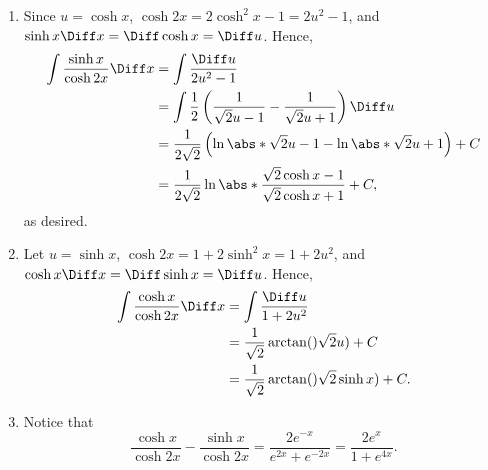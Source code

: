 \Question{\currfilebase}
\begin{enumerate}
    \item Since \(u = \cosh x\), \(\cosh 2x = 2 \cosh^2 x - 1 = 2 u^2 - 1\), and \(\sinh x \Diff x = \Diff \cosh x = \Diff u\). Hence,
          \begin{align*}
              \int \frac{\sinh x}{\cosh 2x} \Diff x & = \int \frac{\Diff u}{2 u^2 - 1}                                                          \\
                                                    & = \int \frac{1}{2} \left(\frac{1}{\sqrt{2}u - 1} - \frac{1}{\sqrt{2}u + 1}\right) \Diff u \\
                                                    & = \frac{1}{2\sqrt{2}} \left(\ln\abs*{\sqrt{2}u - 1} - \ln\abs*{\sqrt{2}u + 1}\right) + C  \\
                                                    & = \frac{1}{2\sqrt{2}} \ln\abs*{\frac{\sqrt{2}\cosh x - 1}{\sqrt{2}\cosh x + 1}} + C,
          \end{align*}
          as desired.

    \item Let \(u = \sinh x\), \(\cosh 2x = 1 + 2\sinh^2 x = 1 + 2u^2\), and \(\cosh x \Diff x = \Diff \sinh x = \Diff u\). Hence,
          \begin{align*}
              \int \frac{\cosh x}{\cosh 2x} \Diff x & = \int \frac{\Diff u}{1 + 2u^2}                      \\
                                                    & = \frac{1}{\sqrt{2}}\arctan()\sqrt{2}u) + C          \\
                                                    & = \frac{1}{\sqrt{2}} \arctan()\sqrt{2} \sinh x) + C.
          \end{align*}

    \item Notice that
          \[
              \frac{\cosh x}{\cosh 2x} - \frac{\sinh x}{\cosh 2x} = \frac{2e^{-x}}{e^{2x} + e^{-2x}} = \frac{2e^{x}}{1 + e^{4x}}.
          \]


\end{enumerate}
